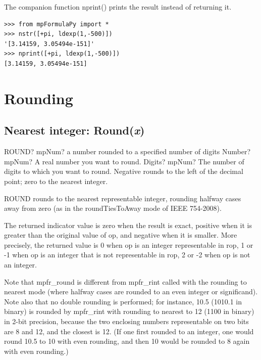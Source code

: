 \vpara
The companion function nprint() prints the result instead of returning it.

\begin{lstlisting}
>>> from mpFormulaPy import *
>>> nstr([+pi, ldexp(1,-500)])
'[3.14159, 3.05494e-151]'
>>> nprint([+pi, ldexp(1,-500)])
[3.14159, 3.05494e-151]
\end{lstlisting}



\newpage
\section{Rounding}
\label{IntegerandRemainderRelatedFunctions}




\subsection{Nearest integer: Round(\textit{x})}

\begin{mpFunctionsExtract}
	\mpWorksheetFunctionTwoNotImplemented
	{ROUND? mpNum? a number rounded to a specified number of digits}
	{Number? mpNum? A real number you want to round.}
	{Digits? mpNum? The number of digits to which you want to round. Negative rounds to the left of the decimal point; zero to the nearest integer.}
\end{mpFunctionsExtract}

\vspace{0.3cm}
ROUND rounds to the nearest representable integer, rounding halfway cases away from zero (as in the roundTiesToAway mode of IEEE 754-2008).

The returned indicator value is zero when the result is exact, positive when it is greater than the
original value of op, and negative when it is smaller. More precisely, the returned value is
0 when op is an integer representable in rop, 1 or -1 when op is an integer that is not
representable in rop, 2 or -2 when op is not an integer.

Note that mpfr\_round is different from mpfr\_rint called with the rounding to nearest mode
(where halfway cases are rounded to an even integer or significand). Note also that no double
rounding is performed; for instance, 10.5 (1010.1 in binary) is rounded by mpfr\_rint with
rounding to nearest to 12 (1100 in binary) in 2-bit precision, because the two enclosing
numbers representable on two bits are 8 and 12, and the closest is 12. (If one first rounded
to an integer, one would round 10.5 to 10 with even rounding, and then 10 would be rounded
to 8 again with even rounding.)


